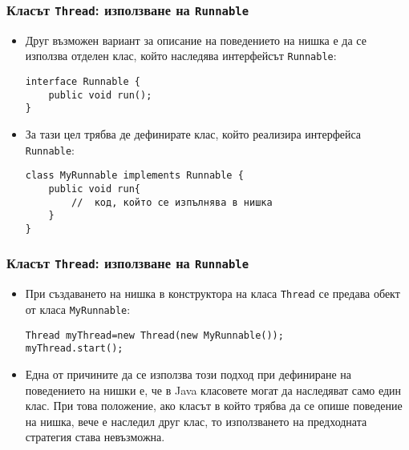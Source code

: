 \documentclass[ignorenonframetext, hyperref=unicode,compress]{beamer}
\begin{document}
\begin{frame}[containsverbatim]
\frametitle{Класът \lstinline{Thread}: използване на \lstinline{Runnable} }
\begin{itemize}
\item Друг възможен вариант за описание на поведението на нишка е да се
използва отделен клас, който наследява интерфейсът \lstinline{Runnable}:
\begin{lstlisting}
interface Runnable {
	public void run();
}
\end{lstlisting}
\item За тази цел трябва де дефинирате клас, който реализира интерфейса
\lstinline{Runnable}:
\begin{lstlisting}
class MyRunnable implements Runnable {
	public void run{
		//  код, който се изпълнява в нишка
	}
}
\end{lstlisting}
\end{itemize}
\end{frame}


\begin{frame}[containsverbatim]
\frametitle{Класът \lstinline{Thread}: използване на \lstinline{Runnable} }
\begin{itemize}
\item При създаването на нишка в конструктора на класа \lstinline{Thread} се
предава обект от класа \lstinline{MyRunnable}:
\begin{lstlisting}
Thread myThread=new Thread(new MyRunnable());
myThread.start();
\end{lstlisting}
\item Една от причините да се използва този подход при дефиниране на
поведението на нишки е, че в Java класовете могат да наследяват само един клас.
При това положение, ако класът в който трябва да се опише поведение на нишка,
вече е наследил друг клас, то използването на предходната стратегия става
невъзможна.
\end{itemize}
\end{frame}
\end{document}
